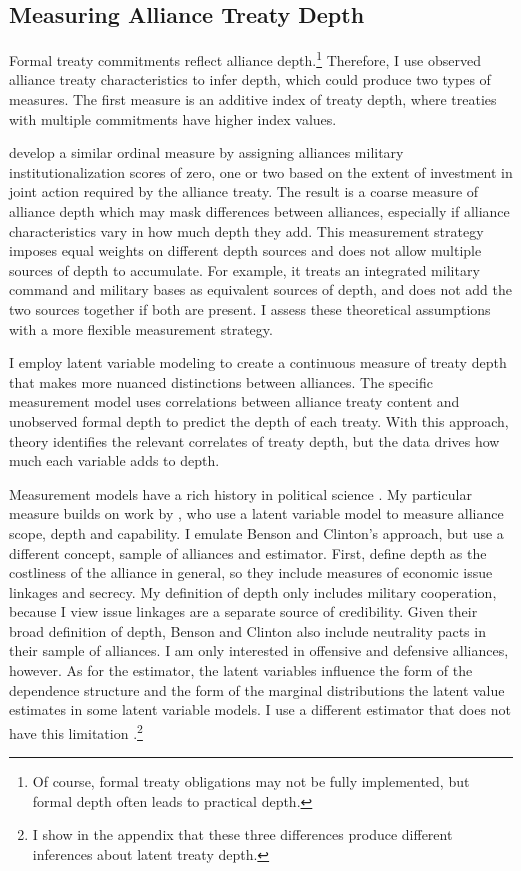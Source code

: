 \documentclass[12pt]{article}
\begin{document}
\subsection{Measuring Alliance Treaty Depth} 


Formal treaty commitments reflect alliance depth.\footnote{Of course, formal treaty obligations may not be fully implemented, but formal depth often leads to practical depth.}
Therefore, I use observed alliance treaty characteristics to infer depth, which could produce two types of measures. 
The first measure is an additive index of treaty depth, where treaties with multiple commitments have higher index values. 


\citep{LeedsAnac2005} develop a similar ordinal measure by assigning alliances military institutionalization scores of zero, one or two based on the extent of investment in joint action required by the alliance treaty. 
The result is a coarse measure of alliance depth which may mask differences between alliances, especially if alliance characteristics vary in how much depth they add. 
This measurement strategy imposes equal weights on different depth sources and does not allow multiple sources of depth to accumulate. 
For example, it treats an integrated military command and military bases as equivalent sources of depth, and does not add the two sources together if both are present. 
I assess these theoretical assumptions with a more flexible measurement strategy.
 
 
I employ latent variable modeling to create a continuous measure of treaty depth that makes more nuanced distinctions between alliances.
The specific measurement model uses correlations between alliance treaty content and unobserved formal depth to predict the depth of each treaty. 
With this approach, theory identifies the relevant correlates of treaty depth, but the data drives how much each variable adds to depth. 


Measurement models have a rich history in political science \citep{Clintonetal2004, TreierJackman2008, Fariss2014}.
My particular measure builds on work by \citet{BensonClinton2016}, who use a latent variable model \citep{Quinn2004} to measure alliance scope, depth and capability.  
I emulate Benson and Clinton's approach, but use a different concept, sample of alliances and estimator. 
First, \citet{BensonClinton2016} define depth as the costliness of the alliance in general, so they include measures of economic issue linkages and secrecy.
My definition of depth only includes military cooperation, because I view issue linkages are a separate source of credibility. 
Given their broad definition of depth, Benson and Clinton also include neutrality pacts in their sample of alliances.
I am only interested in offensive and defensive alliances, however.  
As for the estimator, the latent variables influence the form of the dependence structure and the form of the marginal distributions the latent value estimates in some latent variable models. 
I use a different estimator that does not have this limitation \citep{Murrayetal2013}.\footnote{I show in the appendix that these three differences produce different inferences about latent treaty depth.}
\end{document}
